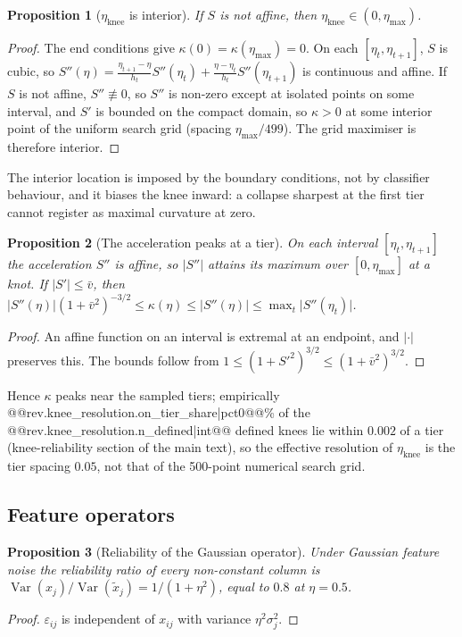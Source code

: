 \documentclass[pdflatex,sn-mathphys]{sn-jnl}
\newcommand{\etamax}{\eta_{\max}}
\newcommand{\etaknee}{\eta_{\mathrm{knee}}}
\theoremstyle{thmstyleone}
\newtheorem{supproposition}{Proposition}
\begin{document}
\begin{supproposition}[$\etaknee$ is interior]\label{prop:s_interior}
If $S$ is not affine, then $\etaknee\in(0,\etamax)$.
\end{supproposition}
\begin{proof}
The end conditions give $\kappa(0)=\kappa(\etamax)=0$. On each $[\eta_t,\eta_{t+1}]$, $S$ is cubic, so $S''(\eta)=\frac{\eta_{t+1}-\eta}{h_t}S''(\eta_t)+\frac{\eta-\eta_t}{h_t}S''(\eta_{t+1})$ is continuous and affine. If $S$ is not affine, $S''\not\equiv0$, so $S''$ is non-zero except at isolated points on some interval, and $S'$ is bounded on the compact domain, so $\kappa>0$ at some interior point of the uniform search grid (spacing $\etamax/499$). The grid maximiser is therefore interior.
\end{proof}
The interior location is imposed by the boundary conditions, not by classifier behaviour, and it biases the knee inward: a collapse sharpest at the first tier cannot register as maximal curvature at zero.

\begin{supproposition}[The acceleration peaks at a tier]\label{prop:s_peak}
On each interval $[\eta_t,\eta_{t+1}]$ the acceleration $S''$ is affine, so $\lvert S''\rvert$ attains its maximum over $[0,\etamax]$ at a knot. If $\lvert S'\rvert\le\bar v$, then $\lvert S''(\eta)\rvert(1+\bar v^{2})^{-3/2}\le\kappa(\eta)\le\lvert S''(\eta)\rvert\le\max_t\lvert S''(\eta_t)\rvert$.
\end{supproposition}
\begin{proof}
An affine function on an interval is extremal at an endpoint, and $\lvert\cdot\rvert$ preserves this. The bounds follow from $1\le(1+S'^{2})^{3/2}\le(1+\bar v^{2})^{3/2}$.
\end{proof}
Hence $\kappa$ peaks near the sampled tiers; empirically @@{rev.knee_resolution.on_tier_share|pct0}@@\% of the @@{rev.knee_resolution.n_defined|int}@@ defined knees lie within $0.002$ of a tier (knee-reliability section of the main text), so the effective resolution of $\etaknee$ is the tier spacing $0.05$, not that of the 500-point numerical search grid.

\subsection{Feature operators}
\begin{supproposition}[Reliability of the Gaussian operator]\label{prop:s_gaussian}
Under Gaussian feature noise the reliability ratio of every non-constant column is $\operatorname{Var}(x_j)/\operatorname{Var}(\tilde x_j)=1/(1+\eta^{2})$, equal to $0.8$ at $\eta=0.5$.
\end{supproposition}
\begin{proof}
$\varepsilon_{ij}$ is independent of $x_{ij}$ with variance $\eta^{2}\sigma_j^{2}$.
\end{proof}
\end{document}
